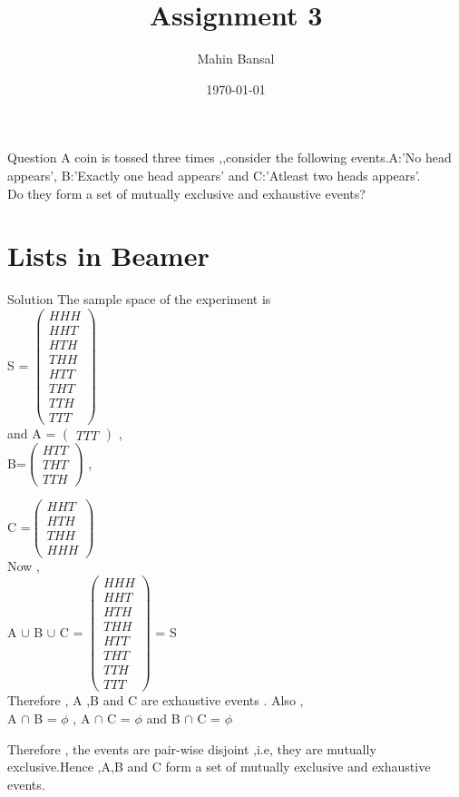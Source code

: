 \documentclass{beamer}
\title{Assignment 3}
\author{Mahin Bansal}
\date{\today}
\begin{document}
\newcommand{\myvec}[1]{\ensuremath{\begin{pmatrix}#1\end{pmatrix}}}
\begin{frame}
    \titlepage 
\end{frame}

\logo{}


\begin{frame}{Question}
   A coin is tossed three times ,,consider the following events.A:'No head appears', B:'Exactly one head appears' and C:'Atleast two heads appears'. \\Do they form a set of mutually exclusive and exhaustive events?
\end{frame}


\section{Lists in Beamer}
\begin{frame}{Solution}
The sample space of the experiment is \\

{S} = \myvec{HHH \\HHT\\HTH \\THH \\HTT \\ THT\\TTH \\ TTT}\\ 
and {A} = \myvec{TTT} ,\\
{B}=\myvec{HTT \\ THT \\ TTH} , \\
\end{frame} 
\begin{frame}

C =\myvec{HHT \\ HTH \\ THH \\ HHH} \\ 
Now ,\\ 
A $\cup$ {B} $\cup$ {C} = \myvec{HHH \\HHT\\HTH \\THH \\HTT \\ THT\\TTH \\ TTT} = {S} \\ 
Therefore , {A} ,{B} and {C} are exhaustive events .
Also ,\\ {A} $\cap$ {B} = $ \phi$ , {A} $\cap$ {C} = $\phi$ and {B} $\cap$ {C} = $\phi$\\

\end{frame}
\begin{frame}

Therefore , the events are pair-wise disjoint ,i.e, they are mutually exclusive.Hence ,A,B and C form a set of mutually exclusive and exhaustive events.


\end{frame}
\end{document}
